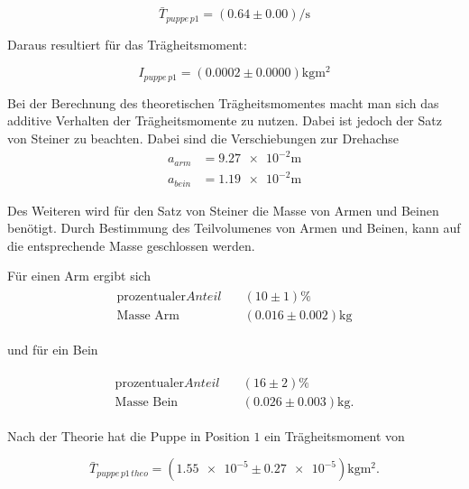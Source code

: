 \begin{equation*}
\bar{T}_{puppe\, p1}=\left(\num{0.64}\pm\num{0.00}\right) \si{\per\second}
\end{equation*}

Daraus resultiert für das Trägheitsmoment:

\begin{equation}
\label{eq:traeg_puppe_p1}
I_{puppe \,p1}= \left(\num{0.0002}\pm\num{0.0000}\right)\si{\kilogram\meter\squared}
\end{equation}

Bei der Berechnung des theoretischen Trägheitsmomentes macht man sich
das additive Verhalten der Trägheitsmomente zu nutzen.
Dabei ist jedoch der Satz von Steiner zu beachten.
 Dabei sind die Verschiebungen zur Drehachse
\begin{align*}
a_{arm}&=\num{9.27e-2}\si{\meter}\\
a_{bein}&=\num{1.19e-2}\si{\meter}
\end{align*}

Des Weiteren wird für den Satz von Steiner die Masse von Armen und Beinen benötigt.
Durch Bestimmung des Teilvolumenes von Armen und Beinen, kann auf die entsprechende Masse
geschlossen werden.

Für einen Arm ergibt sich
\begin{align}
\begin{aligned}
\label{eq:masse_arm}
\text{prozentualer} Anteil \quad &\left(10\pm\num{1}\right)\% \\
\text{Masse Arm} \quad &\left(\num{0.016}\pm\num{0.002}\right)\si{\kilogram}
\end{aligned}
\end{align}

und für ein Bein

\begin{align}
\begin{aligned}
\label{eq:masse_bein}
\text{prozentualer} Anteil \quad &\left(16\pm\num{2}\right)\% \\
\text{Masse Bein} \quad &\left(\num{0.026}\pm\num{0.003}\right)\si{\kilogram}.
\end{aligned}
\end{align}

Nach der Theorie hat die Puppe in Position $1$ ein Trägheitsmoment von

\begin{equation*}
\bar{T}_{puppe\, p1\,theo}=\left(\num{1.55e-5}\pm\num{0.27e-5}\right) \si{\kilogram\meter\squared}.
\end{equation*}

